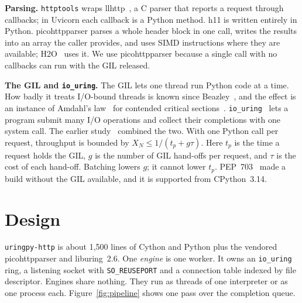 \documentclass[10pt,twocolumn,letterpaper]{article}
\newcommand{\code}[1]{\texttt{#1}}
\begin{document}
\textbf{Parsing.} \code{httptools} wraps llhttp~\cite{llhttp}, a C parser
that reports a request through callbacks; in Uvicorn each callback is a
Python method. h11 is written entirely in Python. picohttpparser
\cite{picohttpparser} parses a whole header block in one call, writes the
results into an array the caller provides, and uses SIMD instructions where
they are available; H2O~\cite{h2o} uses it. We use picohttpparser because a
single call with no callbacks can run with the GIL released.

\textbf{The GIL and \code{io\_uring}.} The GIL lets one thread run Python
code at a time. How badly it treats I/O-bound threads is known since
Beazley~\cite{beazley}, and the effect is an instance of Amdahl's
law~\cite{amdahl} for contended critical sections~\cite{eyerman}.
\code{io\_uring}~\cite{axboe} lets a program submit many I/O operations and
collect their completions with one system call. The earlier
study~\cite{uringpy} combined the two. With one Python call per request,
throughput is bounded by $X_N \le 1/(t_p + g\tau)$. Here $t_p$ is the time a
request holds the GIL, $g$ is the number of GIL hand-offs per request, and
$\tau$ is the cost of each hand-off. Batching lowers $g$; it cannot lower
$t_p$. PEP~703~\cite{pep703} made a build without the GIL available, and it
is supported from CPython~3.14.

\section{Design}

\code{uringpy-http} is about 1,500 lines of Cython and Python plus the
vendored picohttpparser and liburing~2.6. One \emph{engine} is one worker. It
owns an \code{io\_uring} ring, a listening socket with \code{SO\_REUSEPORT}
and a connection table indexed by file descriptor. Engines share nothing.
They run as threads of one interpreter or as one process each.
Figure~\ref{fig:pipeline} shows one pass over the completion queue.
\end{document}
